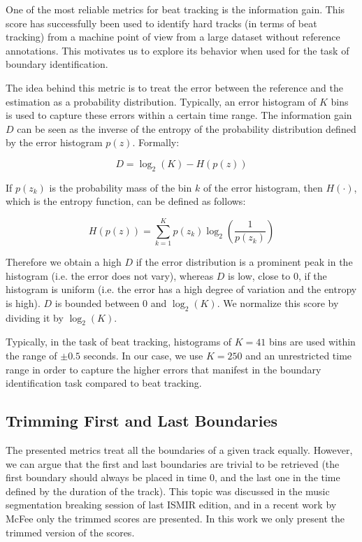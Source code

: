 \documentclass{article}
\begin{document}
One of the most reliable metrics for beat tracking is the information gain\cite{Davies2009}. 
This score has successfully been used to identify hard tracks (in terms of beat tracking) from a machine point of view from a large dataset without reference annotations\cite{Holzapfel2012}.
This motivates us to explore its behavior when used for the task of boundary identification.

The idea behind this metric is to treat the error between the reference and the estimation as a probability distribution.
Typically, an error histogram of $K$ bins is used to capture these errors within a certain time range.
The information gain $D$ can be seen as the inverse of the entropy of the probability distribution defined by the error histogram $p(z)$. Formally:

\begin{equation}
  D = \log_2(K) - H(p(z))
\end{equation}

If $p(z_k)$ is the probability mass of the bin $k$ of the error histogram, then $H(\cdot)$, which is the entropy function, can be defined as follows:

\begin{equation}
  H(p(z)) = \sum_{k=1}^K p(z_k) \log_2 \left( \frac{1}{p(z_k)} \right)
\end{equation}

Therefore we obtain a high $D$ if the error distribution is a prominent peak in the histogram (i.e. the error does not vary), whereas $D$ is low, close to 0, if the histogram is uniform (i.e. the error has a high degree of variation and the entropy is high).
$D$ is bounded between 0 and $\log_2(K)$.
We normalize this score by dividing it by $\log_2(K)$.

Typically, in the task of beat tracking, histograms of $K=41$ bins are used within the range of $\pm0.5$ seconds.
In our case, we use $K=250$ and an unrestricted time range in order to capture the higher errors that manifest in the boundary identification task compared to beat tracking.

\subsection{Trimming First and Last Boundaries}

The presented metrics treat all the boundaries of a given track equally. 
However, we can argue that the first and last boundaries are trivial to be retrieved (the first boundary should always be placed in time 0, and the last one in the time defined by the duration of the track). 
This topic was discussed in the music segmentation breaking session of last ISMIR edition\cite{Nieto2013}, and in a recent work by McFee only the trimmed scores are presented\cite{McFee2014}. 
In this work we only present the trimmed version of the scores.
\end{document}
